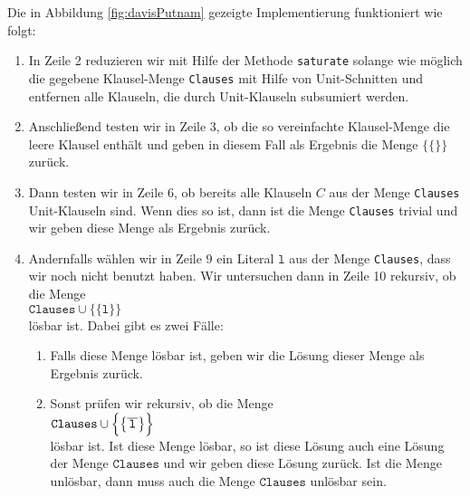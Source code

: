 Die in Abbildung \ref{fig:davisPutnam} gezeigte Implementierung funktioniert wie folgt:
\begin{enumerate}
\item In Zeile 2 reduzieren wir mit Hilfe der Methode \texttt{saturate} 
      solange wie möglich die gegebene Klausel-Menge \texttt{Clauses} mit Hilfe
      von Unit-Schnitten und entfernen alle Klauseln, die durch Unit-Klauseln
      subsumiert werden.
\item Anschließend testen wir in Zeile 3, ob die so vereinfachte Klausel-Menge
      die leere Klausel enthält und geben in diesem Fall als Ergebnis die Menge 
      $\bigl\{\{\}\bigr\}$ zurück.
\item Dann testen wir in Zeile 6, ob bereits alle Klauseln $C$ aus der Menge
      \texttt{Clauses} Unit-Klauseln sind.  Wenn dies so ist,
      dann ist die Menge \texttt{Clauses} trivial und wir geben diese Menge als Ergebnis zurück.
\item Andernfalls wählen wir in Zeile 9 ein Literal $\texttt{l}$ aus der Menge \texttt{Clauses}, 
      dass wir noch nicht benutzt haben.
      Wir untersuchen dann in Zeile 10 rekursiv, ob die Menge \\[0.2cm]
      \hspace*{1.3cm} 
      $\texttt{Clauses} \cup \bigl\{\{\texttt{l}\}\bigr\}$ 
      \\[0.2cm]
      lösbar ist.  Dabei gibt es zwei Fälle:
      \begin{enumerate}
      \item Falls diese Menge lösbar ist, geben wir die Lösung dieser Menge als Ergebnis zurück.

      \item Sonst  prüfen wir rekursiv, ob die Menge 
            \\[0.2cm]
            \hspace*{1.3cm}
            $\texttt{Clauses} \cup \Bigl\{ \bigl\{ \overline{\,\texttt{l}\,} \bigr\} \Bigr\}$ 
            \\[0.2cm]
            lösbar ist.  Ist diese Menge lösbar, so ist diese Lösung auch eine
            Lösung der Menge $\texttt{Clauses}$ und wir geben diese Lösung zurück.  Ist die
            Menge unlösbar, dann muss auch die Menge $\texttt{Clauses}$ unlösbar sein.
      \end{enumerate}
\end{enumerate}
